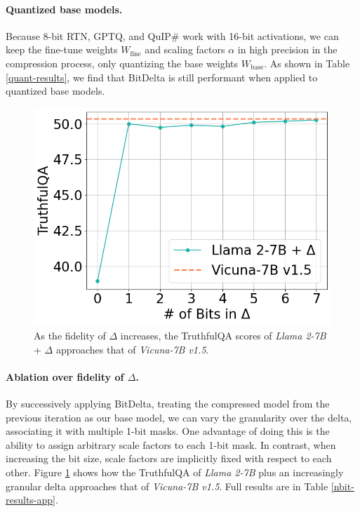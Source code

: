 \documentclass[numbers]{article}
\newcommand{\oursmethod}{BitDelta\xspace}
\begin{document}
\paragraph{Quantized base models. }



Because 8-bit RTN, GPTQ, and QuIP\# work with 16-bit activations, we can keep the fine-tune weights $W_\text{fine}$ and scaling factors $\alpha$ in high precision in the compression process, only quantizing the base weights $W_\text{base}$. As shown in Table \ref{quant-results}, we find that \oursmethod is still performant when applied to quantized base models. 






\begin{figure} %
    \hspace{-10pt}
    \centering
    \includegraphics[width=0.8\linewidth]{nbit.png}
    \caption{As the fidelity of $\Delta$ increases, the TruthfulQA scores of \textit{Llama 2-7B} + $\Delta$ approaches that of \textit{Vicuna-7B v1.5}.}
    \label{fig:nbit}
\end{figure}


\paragraph{Ablation over fidelity of $\Delta$. }
By successively applying \oursmethod, treating the compressed model from the previous iteration as our base model, we can vary the granularity over the delta, associating it with multiple 1-bit masks. One advantage of doing this is the ability to assign arbitrary scale factors to each 1-bit mask. In contrast, when increasing the bit size, scale factors are implicitly fixed with respect to each other. Figure \ref{fig:nbit} shows how the TruthfulQA of \textit{Llama 2-7B} plus an increasingly granular delta approaches that of \textit{Vicuna-7B v1.5}. Full results are in Table \ref{nbit-results-app}.
\end{document}
